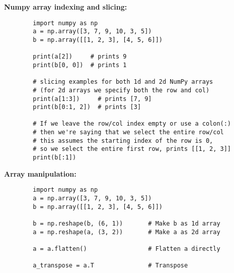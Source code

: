 \documentclass[12pt]{article}
\begin{document}
\medskip
\noindent \textbf{Numpy array indexing and slicing:}
    \begin{verbatim}
        import numpy as np
        a = np.array([3, 7, 9, 10, 3, 5])
        b = np.array([[1, 2, 3], [4, 5, 6]])
        
        print(a[2])     # prints 9
        print(b[0, 0])  # prints 1
        
        # slicing examples for both 1d and 2d NumPy arrays
        # (for 2d arrays we specify both the row and col)
        print(a[1:3])     # prints [7, 9]
        print(b[0:1, 2])  # prints [3]
        
        # If we leave the row/col index empty or use a colon(:)
        # then we're saying that we select the entire row/col
        # this assumes the starting index of the row is 0,
        # so we select the entire first row, prints [[1, 2, 3]]
        print(b[:1])      
    \end{verbatim}

\newpage
\noindent \textbf{Array manipulation:}
    \begin{verbatim}
        import numpy as np
        a = np.array([3, 7, 9, 10, 3, 5])
        b = np.array([[1, 2, 3], [4, 5, 6]])
        
        b = np.reshape(b, (6, 1))       # Make b as 1d array
        a = np.reshape(a, (3, 2))       # Make a as 2d array
        
        a = a.flatten()                 # Flatten a directly
        
        a_transpose = a.T               # Transpose
    \end{verbatim}
\end{document}
